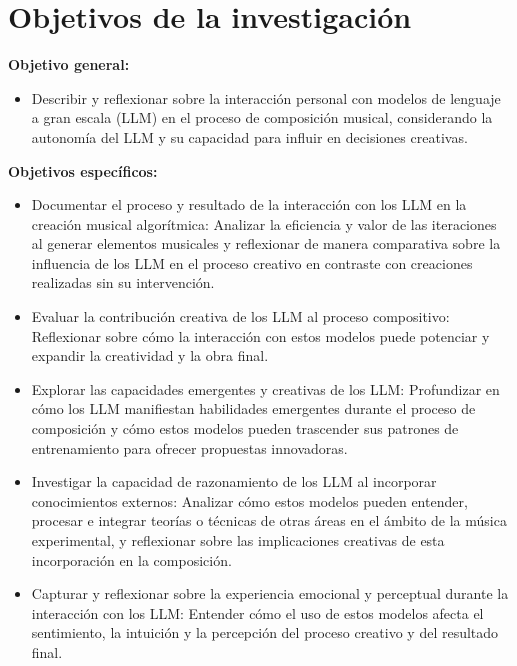 \section{Objetivos de la investigación}

\textbf{Objetivo general:}
\begin{itemize}
    \item Describir y reflexionar sobre la interacción personal con modelos de lenguaje a gran escala (LLM) en el proceso de composición musical, considerando la autonomía del LLM y su capacidad para influir en decisiones creativas.
\end{itemize}

\textbf{Objetivos específicos:}
\begin{itemize}
    \item Documentar el proceso y resultado de la interacción con los LLM en la creación musical algorítmica: Analizar la eficiencia y valor de las iteraciones al generar elementos musicales y reflexionar de manera comparativa sobre la influencia de los LLM en el proceso creativo en contraste con creaciones realizadas sin su intervención.
    \item Evaluar la contribución creativa de los LLM al proceso compositivo: Reflexionar sobre cómo la interacción con estos modelos puede potenciar y expandir la creatividad y la obra final.
    \item Explorar las capacidades emergentes y creativas de los LLM: Profundizar en cómo los LLM manifiestan habilidades emergentes durante el proceso de composición y cómo estos modelos pueden trascender sus patrones de entrenamiento para ofrecer propuestas innovadoras.
    \item Investigar la capacidad de razonamiento de los LLM al incorporar conocimientos externos: Analizar cómo estos modelos pueden entender, procesar e integrar teorías o técnicas de otras áreas en el ámbito de la música experimental, y reflexionar sobre las implicaciones creativas de esta incorporación en la composición.
    \item Capturar y reflexionar sobre la experiencia emocional y perceptual durante la interacción con los LLM: Entender cómo el uso de estos modelos afecta el sentimiento, la intuición y la percepción del proceso creativo y del resultado final.
\end{itemize}
